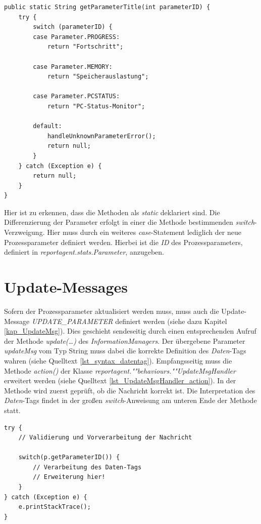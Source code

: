 \documentclass[a4paper,12pt,oneside,openright,onecolumn,final,titlepage,fleqn,ngerman]{scrreprt}
\renewcommand{\lstlistingname}{Quelltext}
\begin{document}
	\begin{lstlisting}[caption={reportagent.stats.ParameterMap.getParameterTitle()},label={lst_ParameterMap_getParameterTitle}]
public static String getParameterTitle(int parameterID) {
	try {
		switch (parameterID) {
		case Parameter.PROGRESS:
			return "Fortschritt";
			
		case Parameter.MEMORY:
			return "Speicherauslastung";
			
		case Parameter.PCSTATUS:
			return "PC-Status-Monitor";
			
		default:
			handleUnknownParameterError();
			return null;
		}
	} catch (Exception e) {
		return null;
	}
}
	\end{lstlisting}
	
	Hier ist zu erkennen, dass die Methoden als \emph{static} deklariert sind. Die Differenzierung der Parameter erfolgt in einer die Methode bestimmenden \emph{switch}-Verzweigung. Hier muss durch ein weiteres \emph{case}-Statement lediglich der neue Prozessparameter definiert werden. Hierbei ist die \emph{ID} des Prozessparameters, definiert in \emph{reportagent.stats.Parameter}, anzugeben.
	
	\section{Update-Messages}
	Sofern der Prozessparameter aktualisiert werden muss, muss auch die Update-Message \emph{UPDATE\_PARAMETER} definiert werden (siehe dazu Kapitel \ref{kap_UpdateMsg}). Dies geschieht sendeseitig durch einen entsprechenden Aufruf der Methode \emph{update(\ldots)} des \emph{InformationManagers}. Der übergebene Parameter \emph{updateMsg} vom Typ String muss dabei die korrekte Definition des \emph{Daten}-Tags wahren (siehe \lstlistingname{} \ref{lst_syntax_datentag}). Empfangsseitig muss die Methode \emph{action()} der Klasse \emph{reportagent.""behaviours.""Update\-Msg\-Handler} erweitert werden (siehe \lstlistingname{} \ref{lst_UpdateMsgHandler_action}). In der Methode wird zuerst geprüft, ob die Nachricht korrekt ist. Die Interpretation des \emph{Daten}-Tags findet in der großen \emph{switch}-Anweisung am unteren Ende der Methode statt.
	
	\begin{lstlisting}[caption={reportagent.behaviours.UpdateMsgHandler.action()},label={lst_UpdateMsgHandler_action}]
try {
	// Validierung und Vorverarbeitung der Nachricht
	
	switch(p.getParameterID()) {
		// Verarbeitung des Daten-Tags
		// Erweiterung hier!
	}
} catch (Exception e) {
	e.printStackTrace();
}
	\end{lstlisting}
\end{document}
